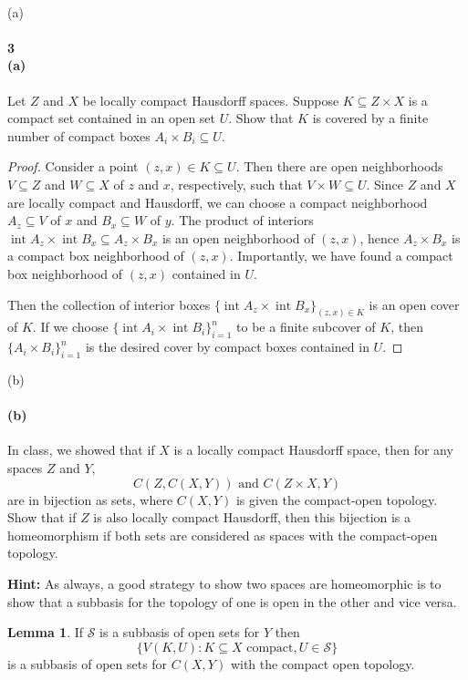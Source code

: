 \documentclass[12pt]{article}
\newlength{\myparskip}
\newenvironment{fullbox}{\begin{lrbox}{\savefullbox}\begin{minipage}{\dimexpr\textwidth-2\fboxsep\relax}\setlength{\parskip}{\myparskip}}{\end{minipage}\end{lrbox}\framebox[\textwidth]{\usebox{\savefullbox}}}
\newenvironment{pbox}[1][]{\begin{fullbox}\ifx#1\empty\else\paragraph{#1}\phantom{}\fi}{\end{fullbox}}
\theoremstyle{definition}
\newtheorem{lemma}{Lemma}
\newcommand{\<}{\langle}
\renewcommand{\>}{\rangle}
\DeclareMathOperator{\inter}{int}
\renewcommand{\SS}{\mathcal{S}}
\begin{document}
\newpage
\begin{pbox}[3 \\ (a)]
    Let $Z$ and $X$ be locally compact Hausdorff spaces.  Suppose
    $K \subseteq Z \times X$ is a compact set contained in an open set $U$.  Show
    that $K$ is covered by a finite number of compact boxes
    $A_i \times B_i \subseteq U$.
\end{pbox}

\begin{proof}
    Consider a point $(z, x) \in K \subseteq U$.
    Then there are open neighborhoods $V \subseteq Z$ and $W \subseteq X$ of $z$ and $x$, respectively, such that $V \times W \subseteq U$.
    Since $Z$ and $X$ are locally compact and Hausdorff, we can choose a compact neighborhood $A_z \subseteq V$ of $x$ and $B_x \subseteq W$ of $y$.
    The product of interiors $\inter A_z \times \inter B_x \subseteq A_z \times B_x$ is an open neighborhood of $(z, x)$, hence $A_z \times B_x$ is a compact box neighborhood of $(z, x)$. 
    Importantly, we have found a compact box neighborhood of $(z, x)$ contained in $U$.

    Then the collection of interior boxes $\{\inter A_z \times \inter B_x\}_{(z, x) \in K}$ is an open cover of $K$.
    If we choose $\{\inter A_i \times \inter B_i\}_{i=1}^{n}$ to be a finite subcover of $K$, then $\{A_i \times B_i\}_{i=1}^{n}$ is the desired cover by compact boxes contained in $U$.
\end{proof}


\begin{pbox}[(b)]
    In class, we showed that if $X$ is a locally compact Hausdorff space,
    then for any spaces $Z$ and $Y$,
    \[C(Z,C(X,Y))\text{ and }C(Z \times X,Y)\]
    are in bijection as sets, where $C(X,Y)$ is given the compact-open topology.
    Show that if $Z$ is also locally compact Hausdorff, then this bijection is a
    homeomorphism if both sets are considered as spaces with the compact-open
    topology.

    \textbf{Hint:} As always, a good strategy to show two spaces are homeomorphic
    is to show that a subbasis for the topology of one is open in the other and
    vice versa.
\end{pbox}

\begin{lemma}
    If $\SS$ is a subbasis of open sets for $Y$ then 
    \[
        \{V(K, U) : K \subseteq X \text{ compact}, U \in \SS\}
    \]
    is a subbasis of open sets for $C(X, Y)$ with the compact open topology.
\end{lemma}
\end{document}
